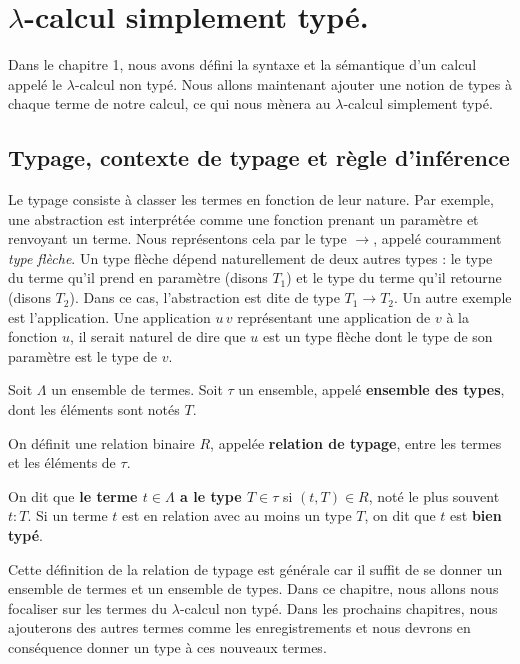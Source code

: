 \chapter{$\lambda$-calcul simplement typé.}

Dans le chapitre 1, nous avons défini la syntaxe et la sémantique d'un calcul
appelé le $\lambda$-calcul non typé. Nous allons maintenant ajouter une notion de types à
chaque terme de notre calcul, ce qui nous mènera au $\lambda$-calcul simplement typé.

\section{Typage, contexte de typage et règle d'inférence}

Le typage consiste à classer les termes en fonction de leur nature. Par exemple,
une abstraction est interprétée comme une fonction prenant un paramètre et
renvoyant un terme. Nous représentons cela par le type $\rightarrow$, appelé
couramment \textit{type flèche}. Un type flèche dépend naturellement de deux autres types : le
type du terme qu'il prend en paramètre (disons $T_{1}$) et le type du terme
qu'il retourne (disons $T_{2}$). Dans ce cas, l'abstraction est dite de type
$T_{1} \rightarrow T_{2}$. Un
autre exemple est l'application. Une application $u \, v$ représentant une
application de $v$ à la fonction $u$, il serait naturel de dire que $u$ est un
type flèche dont le type de son paramètre est le type de $v$.

\begin{definition} 
  Soit $\Lambda$ un ensemble de termes.
  Soit $\tau$ un ensemble, appelé \textbf{ensemble des types}, dont les éléments
  sont notés $T$.

  On définit une relation binaire $R$, appelée \textbf{relation de typage}, entre les
  termes et les éléments de $\tau$.
  
  On dit que \textbf{le terme $t \in \Lambda$ a le type $T \in \tau$} si $(t, T)
  \in R$, noté le plus souvent $t : T$. Si un terme $t$ est en relation avec au
  moins un type $T$, on dit que $t$ est \textbf{bien typé}.
\end{definition}

Cette définition de la relation de typage est générale car il suffit de se
donner un ensemble de termes et un ensemble de types. Dans ce chapitre, nous
allons nous focaliser sur les termes du $\lambda$-calcul non typé. Dans les
prochains chapitres, nous ajouterons des autres termes comme les enregistrements
et nous devrons en conséquence donner un type à ces nouveaux termes.

